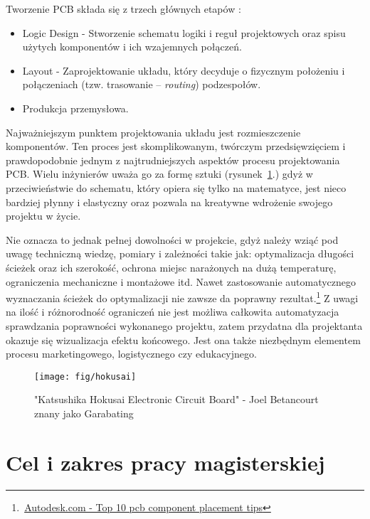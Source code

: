 \documentclass{xmgr}
\begin{document}
\vspace{5mm}
Tworzenie PCB składa się z trzech głównych etapów \cite{Abboud}:

\begin{itemize}
\item
Logic Design - Stworzenie schematu logiki i reguł projektowych oraz spisu użytych komponentów i ich wzajemnych połączeń.
\item
Layout - Zaprojektowanie układu, który decyduje o fizycznym położeniu i połączeniach (tzw. trasowanie -- \emph{routing}) podzespołów.
\item
Produkcja przemysłowa.
\end{itemize}
    
    Najważniejszym punktem projektowania układu jest rozmieszczenie komponentów. Ten proces jest skomplikowanym, twórczym przedsięwzięciem i prawdopodobnie jednym z najtrudniejszych aspektów procesu projektowania PCB. Wielu inżynierów uważa go za formę sztuki (rysunek~\ref{RYS.1}.) gdyż w przeciwieństwie do schematu, który opiera się tylko na matematyce, jest nieco bardziej płynny i elastyczny oraz pozwala na kreatywne wdrożenie swojego projektu w życie.

Nie oznacza to jednak pełnej dowolności w projekcie, gdyż należy wziąć pod uwagę techniczną wiedzę, pomiary i zależności takie jak: optymalizacja długości ścieżek oraz ich szerokość, ochrona miejsc narażonych na dużą temperaturę, ograniczenia mechaniczne i montażowe itd. Nawet zastosowanie automatycznego wyznaczania ścieżek do optymalizacji nie zawsze da poprawny rezultat.\footnote{\,\href{https://www.autodesk.com/products/eagle/blog/top-10-pcb-component-placement-tips-pcb-beginner/}{Autodesk.com - Top 10 pcb component placement tips}} Z uwagi na ilość i różnorodność ograniczeń nie jest możliwa całkowita automatyzacja sprawdzania poprawności wykonanego projektu, zatem przydatna dla projektanta okazuje się wizualizacja efektu końcowego. Jest ona także niezbędnym elementem procesu marketingowego, logistycznego czy edukacyjnego.

\begin{figure}[!tbh]
\centering
\texttt{[image: fig/hokusai]}
\caption{"Katsushika Hokusai Electronic Circuit Board" - Joel Betancourt znany jako Garabating\label{RYS.1}}
\end{figure}

\chapter{Cel i zakres pracy magisterskiej}
\end{document}
